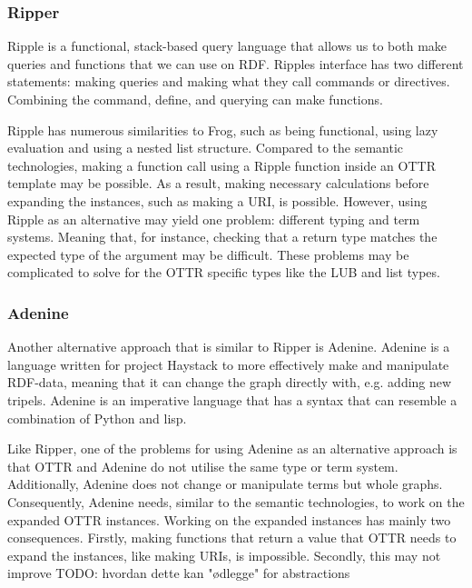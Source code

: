 \subsubsection{Ripper}
Ripple is a functional, stack-based query language that allows us to both make queries and functions that we can use on RDF. Ripples interface has two different statements: making queries and making what they call commands or directives. Combining the command, define, and querying can make functions.   

\para
Ripple has numerous similarities to Frog, such as being functional, using lazy evaluation and using a nested list structure. Compared to the semantic technologies, making a function call using a Ripple function inside an OTTR template may be possible. As a result, making necessary calculations before expanding the instances, such as making a URI, is possible. However, using Ripple as an alternative may yield one problem: different typing and term systems. Meaning that, for instance, checking that a return type matches the expected type of the argument may be difficult. These problems may be complicated to solve for the OTTR specific types like the LUB and list types.    

\subsubsection{Adenine}
Another alternative approach that is similar to Ripper is Adenine. Adenine is a language written for project Haystack to more effectively make and manipulate RDF-data, meaning that it can change the graph directly with, e.g. adding new tripels. Adenine is an imperative language that has a syntax that can resemble a combination of Python and lisp. 

\para
Like Ripper, one of the problems for using Adenine as an alternative approach is that OTTR and Adenine do not utilise the same type or term system. Additionally, Adenine does not change or manipulate terms but whole graphs. Consequently, Adenine needs, similar to the semantic technologies, to work on the expanded OTTR instances. Working on the expanded instances has mainly two consequences. Firstly, making functions that return a value that OTTR needs to expand the instances, like making URIs, is impossible. Secondly, this may not improve   TODO: hvordan dette kan "ødlegge" for abstractions

